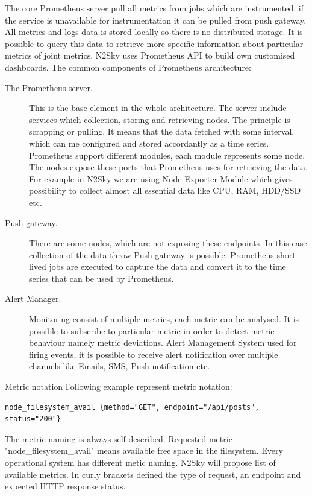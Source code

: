 The core Prometheus server pull all metrics from jobs which are instrumented, if the service is unavailable for instrumentation it can be pulled from push gateway. All metrics and logs data is stored locally so there is no distributed storage. It is possible to query this data to retrieve more specific information about particular metrics of joint metrics. N2Sky uses Prometheus API to build own customised dashboards. 
The common components of Prometheus architecture:
\begin{description}
\item[The Prometheus server.] This is the base element in the whole architecture. The server include services which collection, storing and retrieving nodes. The principle is scrapping or pulling. It means that the data fetched with some interval, which can me configured and stored accordantly as a time series. Prometheus support different modules, each module represents some node. The nodes expose these ports that Prometheus uses for retrieving the data. For example in N2Sky we are using Node Exporter Module which gives possibility to collect almost all essential data like CPU, RAM, HDD/SSD etc.
\item[Push gateway.] There are some nodes, which are not exposing these endpoints. In this case collection of the data throw Push gateway is possible.  Prometheus short-lived jobs are executed to capture the data and convert it to the time series that can be used by Prometheus.
\item [Alert Manager.]  Monitoring consist of multiple metrics, each metric can be analysed. It is possible to subscribe to particular metric in order to detect metric behaviour namely metric deviations. Alert Management System used for firing events, it is possible to receive alert notification over multiple channels like Emails, SMS, Push notification etc.
\end{description}

Metric notation 
Following example represent metric notation:
\begin{lstlisting}
node_filesystem_avail {method="GET", endpoint="/api/posts", status="200"}
\end{lstlisting}

The metric naming is always self-described.  Requested metric "node\_filesystem\_avail" means available free space in the filesystem.  Every operational system has different metic naming. N2Sky will propose list of available metrics. In curly brackets defined the type of request, an endpoint and expected HTTP response status.

